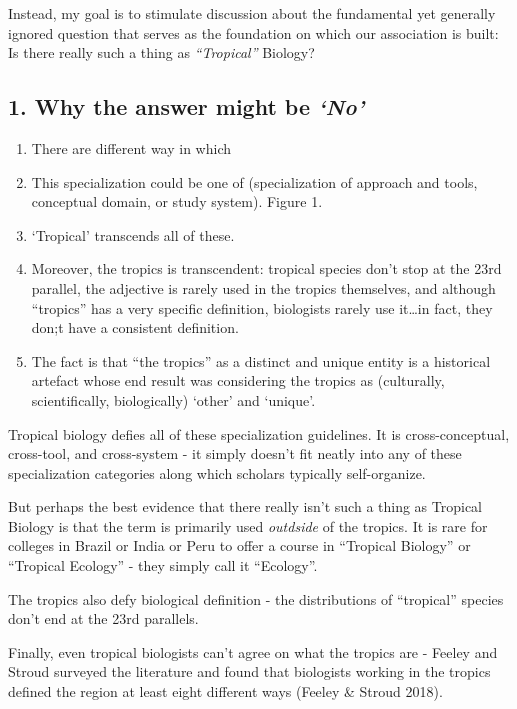 \documentclass[
  12pt,
  man, donotrepeattitle]{apa6}
\begin{document}
Instead, my goal is to stimulate discussion about the fundamental yet generally ignored question that serves as the foundation on which our association is built: Is there really such a thing as \emph{``Tropical''} Biology?

\hypertarget{why-the-answer-might-be-no}{%
\subsection{\texorpdfstring{1. Why the answer might be \emph{`No'}}{1. Why the answer might be `No'}}\label{why-the-answer-might-be-no}}

\begin{enumerate}
\def\labelenumi{\arabic{enumi}.}
\item
  There are different way in which\\
\item
  This specialization could be one of (specialization of approach and tools, conceptual domain, or study system). Figure 1.
\item
  `Tropical' transcends all of these.
\item
  Moreover, the tropics is transcendent: tropical species don't stop at the 23rd parallel, the adjective is rarely used in the tropics themselves, and although ``tropics'' has a very specific definition, biologists rarely use it\ldots in fact, they don;t have a consistent definition.
\item
  The fact is that ``the tropics'' as a distinct and unique entity is a historical artefact whose end result was considering the tropics as (culturally, scientifically, biologically) `other' and `unique'.
\end{enumerate}

Tropical biology defies all of these specialization guidelines.
It is cross-conceptual, cross-tool, and cross-system - it simply doesn't fit neatly into any of these specialization categories along which scholars typically self-organize.

But perhaps the best evidence that there really isn't such a thing as Tropical Biology is that the term is primarily used \emph{outdside} of the tropics. It is rare for colleges in Brazil or India or Peru to offer a course in ``Tropical Biology'' or ``Tropical Ecology'' - they simply call it ``Ecology''.

The tropics also defy biological definition - the distributions of ``tropical'' species don't end at the 23rd parallels.

Finally, even tropical biologists can't agree on what the tropics are - Feeley and Stroud surveyed the literature and found that biologists working in the tropics defined the region at least eight different ways (Feeley \& Stroud 2018).
\end{document}
